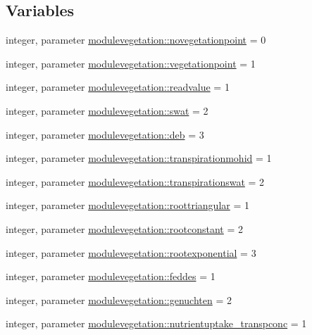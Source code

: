 \subsection*{Variables}
\begin{DoxyCompactItemize}
\item 
integer, parameter \mbox{\hyperlink{namespacemodulevegetation_a8001bdebe574da77fb147554fe710c49}{modulevegetation\+::novegetationpoint}} = 0
\item 
integer, parameter \mbox{\hyperlink{namespacemodulevegetation_aa9569bdafa4413cbb392ae1e779009ae}{modulevegetation\+::vegetationpoint}} = 1
\item 
integer, parameter \mbox{\hyperlink{namespacemodulevegetation_a8d4baebef6e48e57e05cd43519646f2a}{modulevegetation\+::readvalue}} = 1
\item 
integer, parameter \mbox{\hyperlink{namespacemodulevegetation_a48e2a8877a184cb485dc25163f2978cb}{modulevegetation\+::swat}} = 2
\item 
integer, parameter \mbox{\hyperlink{namespacemodulevegetation_a11f2fa58a2f5c093c626318c96888161}{modulevegetation\+::deb}} = 3
\item 
integer, parameter \mbox{\hyperlink{namespacemodulevegetation_acc35043b309d61209624f0904e30ceda}{modulevegetation\+::transpirationmohid}} = 1
\item 
integer, parameter \mbox{\hyperlink{namespacemodulevegetation_aa71bc8152aec332d7671b6dbc3200160}{modulevegetation\+::transpirationswat}} = 2
\item 
integer, parameter \mbox{\hyperlink{namespacemodulevegetation_abb03d062ddc11fc356bc1b6ac2db658a}{modulevegetation\+::roottriangular}} = 1
\item 
integer, parameter \mbox{\hyperlink{namespacemodulevegetation_a4e0ef12556472447215a8ef1e6a670ee}{modulevegetation\+::rootconstant}} = 2
\item 
integer, parameter \mbox{\hyperlink{namespacemodulevegetation_a1e316a9214fb589d7fd3a4e03adff766}{modulevegetation\+::rootexponential}} = 3
\item 
integer, parameter \mbox{\hyperlink{namespacemodulevegetation_a74beec691fce5d94a352b5c0678b7bb5}{modulevegetation\+::feddes}} = 1
\item 
integer, parameter \mbox{\hyperlink{namespacemodulevegetation_a9ad121105341943b97d746a6ee173103}{modulevegetation\+::genuchten}} = 2
\item 
integer, parameter \mbox{\hyperlink{namespacemodulevegetation_a00022541edabc4f88cdf40358ea4c062}{modulevegetation\+::nutrientuptake\+\_\+transpconc}} = 1

\end{DoxyCompactItemize}
